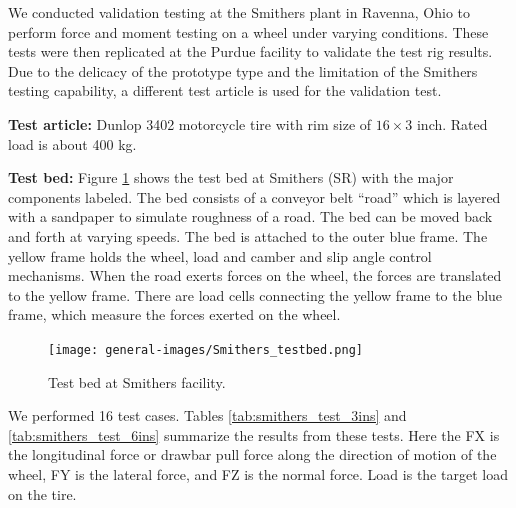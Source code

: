 \documentclass{article}
\begin{document}
We conducted validation testing at the Smithers  plant in Ravenna, Ohio to perform force and moment testing on a wheel under varying conditions. These tests were then replicated at the Purdue facility to validate the test rig results. Due to the  delicacy of the prototype type and the limitation of the Smithers testing capability, a different test article is used for the validation test. 

\textbf{Test article:} Dunlop 3402 motorcycle tire with rim size of $16\times3$ inch. Rated load is about 400 kg. 

\textbf{Test bed:} Figure \ref{fig:smithers_testbed} shows the test bed at Smithers  (SR) with the major components labeled. The bed consists of a conveyor belt “road” which is layered with a sandpaper to simulate roughness of a road. The bed can be moved back and forth at varying speeds. The bed is attached to the outer blue frame. The yellow frame holds the wheel, load and camber and slip angle control mechanisms. When the road exerts forces on the wheel, the forces are translated to the yellow frame. There are load cells connecting the yellow frame to the blue frame, which measure the forces exerted on the wheel.    

\begin{figure}[hbt!]
    \centering
    \texttt{[image: general-images/Smithers\_testbed.png]}
    \caption{Test bed at Smithers facility.}
    \label{fig:smithers_testbed}
\end{figure}

We performed 16 test cases. Tables \ref{tab:smithers_test_3ins} and \ref{tab:smithers_test_6ins} summarize the results from these tests. Here the FX is the longitudinal force or drawbar pull force along the direction of motion of the wheel, FY is the lateral force, and FZ is the normal force. Load is the target load on the tire. 
\end{document}
